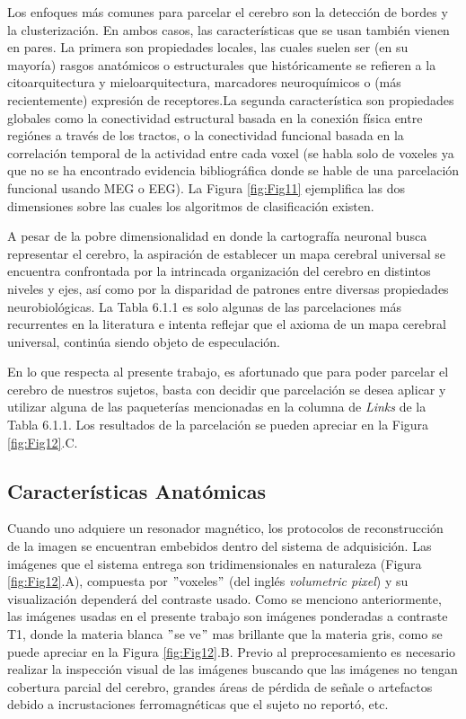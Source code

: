 \documentclass[11pt,letterpaper]{article}
\numberwithin{equation}{subsection}
\numberwithin{table}{subsection}
\begin{document}
\bigskip
\noindent Los enfoques más comunes para parcelar el cerebro son la detección de bordes y la clusterización. En ambos casos, las características que se usan también vienen en pares. La primera son propiedades locales, las cuales suelen ser (en su mayoría) rasgos anatómicos o estructurales que históricamente se refieren a la citoarquitectura y mieloarquitectura, marcadores neuroquímicos o (más recientemente) expresión de receptores.La segunda característica son propiedades globales como la conectividad estructural basada en la conexión física entre regiónes a través de los tractos, o la conectividad funcional basada en la correlación temporal de la actividad entre cada voxel (se habla solo de voxeles ya que no se ha encontrado evidencia bibliográfica donde se hable de una parcelación funcional usando MEG o EEG). La Figura \ref{fig:Fig11} ejemplifica las dos dimensiones sobre las cuales los algoritmos de clasificación existen.


\bigskip
\noindent  A pesar de la pobre dimensionalidad en donde la cartografía neuronal busca representar el cerebro, la aspiración de establecer un mapa cerebral universal se encuentra confrontada por la intrincada organización del cerebro en distintos niveles y ejes, así como por la disparidad de patrones entre diversas propiedades neurobiológicas. La Tabla 6.1.1 es solo algunas de las parcelaciones más recurrentes en la literatura e intenta reflejar que el axioma de un mapa cerebral universal, continúa siendo objeto de especulación. 

\bigskip
\noindent En lo que respecta al presente trabajo, es afortunado que para poder parcelar el cerebro de nuestros sujetos, basta con decidir que parcelación se desea aplicar y utilizar alguna de las paqueterías mencionadas en la columna de \textit{Links} de la Tabla 6.1.1. Los resultados de la parcelación se pueden apreciar en la Figura \ref{fig:Fig12}.C.


\subsection{Características Anatómicas}
\smallskip
\noindent Cuando uno adquiere un resonador magnético, los protocolos de reconstrucción de la imagen se encuentran embebidos dentro del sistema de adquisición. Las imágenes que el sistema entrega son tridimensionales en naturaleza (Figura \ref{fig:Fig12}.A), compuesta por $"$voxeles$"$ (del inglés \textit{volumetric pixel}) y su visualización dependerá del contraste usado. Como se menciono anteriormente, las imágenes usadas en el presente trabajo son imágenes ponderadas a contraste T1, donde la materia blanca $"$se ve$"$ mas brillante que la materia gris, como se puede apreciar en la Figura \ref{fig:Fig12}.B. Previo al preprocesamiento es necesario realizar la inspección visual de las imágenes buscando que las imágenes no tengan cobertura parcial del cerebro, grandes áreas de pérdida de señale o artefactos debido a incrustaciones ferromagnéticas que el sujeto no reportó, etc.
\end{document}
